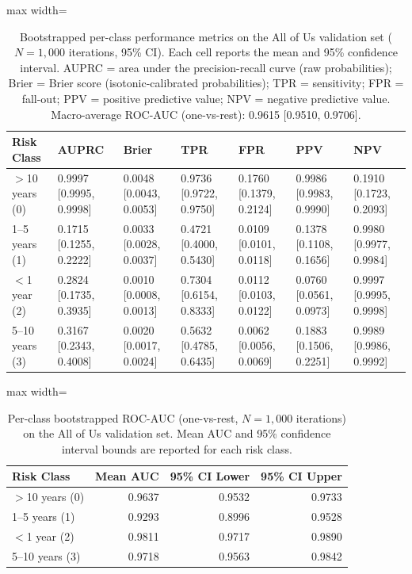 \documentclass{article}
\begin{document}
\begin{table}[h]
\caption{Bootstrapped per-class performance metrics on the All of Us validation set ($N=1{,}000$ iterations, 95\% CI). Each cell reports the mean and 95\% confidence interval. AUPRC = area under the precision-recall curve (raw probabilities); Brier = Brier score (isotonic-calibrated probabilities); TPR = sensitivity; FPR = fall-out; PPV = positive predictive value; NPV = negative predictive value. Macro-average ROC-AUC (one-vs-rest): 0.9615 [0.9510, 0.9706].}
\label{tab:aou_bootstrapped}
\begin{adjustbox}{max width=\textwidth}
\begin{tabular}{lllllll}
\toprule
Risk Class & AUPRC & Brier & TPR & FPR & PPV & NPV \\
\midrule
$>$10 years (0) & 0.9997 [0.9995, 0.9998] & 0.0048 [0.0043, 0.0053] & 0.9736 [0.9722, 0.9750] & 0.1760 [0.1379, 0.2124] & 0.9986 [0.9983, 0.9990] & 0.1910 [0.1723, 0.2093] \\
1--5 years (1)  & 0.1715 [0.1255, 0.2222] & 0.0033 [0.0028, 0.0037] & 0.4721 [0.4000, 0.5430] & 0.0109 [0.0101, 0.0118] & 0.1378 [0.1108, 0.1656] & 0.9980 [0.9977, 0.9984] \\
$<$1 year (2)   & 0.2824 [0.1735, 0.3935] & 0.0010 [0.0008, 0.0013] & 0.7304 [0.6154, 0.8333] & 0.0112 [0.0103, 0.0122] & 0.0760 [0.0561, 0.0973] & 0.9997 [0.9995, 0.9998] \\
5--10 years (3) & 0.3167 [0.2343, 0.4008] & 0.0020 [0.0017, 0.0024] & 0.5632 [0.4785, 0.6435] & 0.0062 [0.0056, 0.0069] & 0.1883 [0.1506, 0.2251] & 0.9989 [0.9986, 0.9992] \\
\bottomrule
\end{tabular}
\end{adjustbox}
\end{table}

\begin{table}[h]
\caption{Per-class bootstrapped ROC-AUC (one-vs-rest, $N=1{,}000$ iterations) on the All of Us validation set. Mean AUC and 95\% confidence interval bounds are reported for each risk class.}
\label{tab:aou_roc_auc}
\begin{adjustbox}{max width=\textwidth}
\begin{tabular}{lrrr}
\toprule
Risk Class & Mean AUC & 95\% CI Lower & 95\% CI Upper \\
\midrule
$>$10 years (0) & 0.9637 & 0.9532 & 0.9733 \\
1--5 years (1)  & 0.9293 & 0.8996 & 0.9528 \\
$<$1 year (2)   & 0.9811 & 0.9717 & 0.9890 \\
5--10 years (3) & 0.9718 & 0.9563 & 0.9842 \\
\bottomrule
\end{tabular}
\end{adjustbox}
\end{table}
\end{document}
